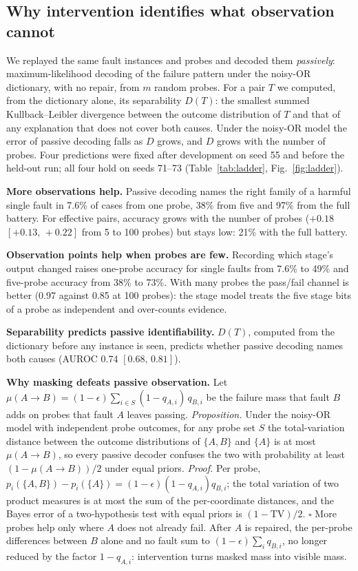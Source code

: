 \documentclass[conference]{IEEEtran}
\newcommand{\ci}[2]{[#1,\,#2]}
\begin{document}
\subsection{Why intervention identifies what observation cannot}\label{sec:res-ladder}
We replayed the same fault instances and probes and decoded them \emph{passively}: maximum-likelihood decoding of the failure pattern under the noisy-OR dictionary, with no repair, from $m$ random probes. For a pair $T$ we computed, from the dictionary alone, its separability $D(T)$: the smallest summed Kullback--Leibler divergence between the outcome distribution of $T$ and that of any explanation that does not cover both causes. Under the noisy-OR model the error of passive decoding falls as $D$ grows, and $D$ grows with the number of probes. Four predictions were fixed after development on seed 55 and before the held-out run; all four hold on seeds 71--73 (Table~\ref{tab:ladder}, Fig.~\ref{fig:ladder}).

\textbf{More observations help.} Passive decoding names the right family of a harmful single fault in 7.6\% of cases from one probe, 38\% from five and 97\% from the full battery. For effective pairs, accuracy grows with the number of probes ($+0.18$ $\ci{+0.13}{+0.22}$ from 5 to 100 probes) but stays low: 21\% with the full battery.

\textbf{Observation points help when probes are few.} Recording which stage's output changed raises one-probe accuracy for single faults from 7.6\% to 49\% and five-probe accuracy from 38\% to 73\%. With many probes the pass/fail channel is better (0.97 against 0.85 at 100 probes): the stage model treats the five stage bits of a probe as independent and over-counts evidence.

\textbf{Separability predicts passive identifiability.} $D(T)$, computed from the dictionary before any instance is seen, predicts whether passive decoding names both causes (AUROC 0.74 $\ci{0.68}{0.81}$).

\textbf{Why masking defeats passive observation.} Let $\mu(A{\to}B)=(1-\epsilon)\sum_{i\in S}(1-q_{A,i})\,q_{B,i}$ be the failure mass that fault $B$ adds on probes that fault $A$ leaves passing. \emph{Proposition.} Under the noisy-OR model with independent probe outcomes, for any probe set $S$ the total-variation distance between the outcome distributions of $\{A,B\}$ and $\{A\}$ is at most $\mu(A{\to}B)$, so every passive decoder confuses the two with probability at least $(1-\mu(A{\to}B))/2$ under equal priors. \emph{Proof.} Per probe, $p_i(\{A,B\})-p_i(\{A\})=(1-\epsilon)(1-q_{A,i})q_{B,i}$; the total variation of two product measures is at most the sum of the per-coordinate distances, and the Bayes error of a two-hypothesis test with equal priors is $(1-\mathrm{TV})/2$. $\square$ More probes help only where $A$ does not already fail. After $A$ is repaired, the per-probe differences between $B$ alone and no fault sum to $(1-\epsilon)\sum_i q_{B,i}$, no longer reduced by the factor $1-q_{A,i}$: intervention turns masked mass into visible mass.
\end{document}
